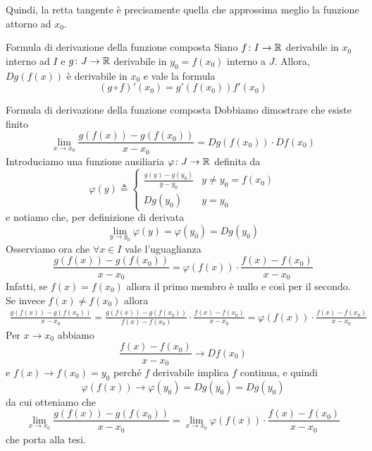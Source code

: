 \documentclass[a4paper]{article}
\begin{document}
Quindi, la retta tangente è precisamente quella che approssima meglio la funzione attorno
ad \(x_0\).

\begin{radioactive}
\begin{snippettheorem}{Formula di derivazione della funzione composta}
    Siano \(f \colon I \to \mathbb{R}\) derivabile in \(x_0\) interno ad \(I\)
    e \(g\colon J \to \mathbb{R}\) derivabile in \(y_0 = f(x_0)\) interno a \(J\).
    Allora, \(D g(f(x))\) è derivabile in \(x_0\) e vale la formula
    \[
        (g\circ f)'(x_0) = g'(f(x_0))f'(x_0)
    \]
\end{snippettheorem}

\begin{snippetproof}{Formula di derivazione della funzione composta}
    Dobbiamo dimostrare che esiste finito
    \[
        \lim_{x\to x_0} \frac{g(f(x)) - g(f(x_0))}{x-x_0} = Dg(f(x_0)) \cdot Df(x_0)
    \]
    Introduciamo una funzione ausiliaria \(\varphi \colon J \to \mathbb{R}\) definita da
    \[
        \varphi(y) \triangleq \begin{cases}
            \frac{g(y) - g(y_0)}{y-y_0} & y \neq y_0 = f(x_0) \\
            Dg(y_0) & y = y_0
        \end{cases}        
    \]
    e notiamo che, per definizione di derivata
    \[
        \lim_{y\to y_0} \varphi(y) = \varphi(y_0) = Dg(y_0)
    \]
    Osserviamo ora che \(\forall x \in I\) vale l'uguaglianza
    \[
        \frac{g(f(x)) - g(f(x_0))}{x-x_0}
        = \varphi(f(x)) \cdot \frac{f(x) - f(x_0)}{x-x_0}
    \]
    Infatti, se \(f(x) = f(x_0)\) allora il primo membro è nullo e così per il secondo.
    Se invece \(f(x) \neq f(x_0)\) allora
    \begin{align*}
        \frac{g(f(x)) - g(f(x_0))}{x-x_0} = \frac{g(f(x)) - g(f(x_0))}{
            f(x) - f(x_0)
        }
        \cdot \frac{f(x) - f(x_0)}{x-x_0}
        = \varphi(f(x)) \cdot \frac{f(x) - f(x_0)}{x-x_0}
    \end{align*}
    Per \(x\to x_0\) abbiamo
    \[
        \frac{f(x) - f(x_0)}{x-x_0} \to Df(x_0)
    \]
    e
    \(f(x) \to f(x_0) = y_0\) perché \(f\) derivabile implica \(f\) continua,
    e quindi
    \[
        \varphi(f(x)) \to \varphi(y_0) = Dg(y_0)
        = Dg(y_0)
    \]
    da cui otteniamo che
    \[
        \lim_{x\to x_0} \frac{g(f(x)) - g(f(x_0))}{x-x_0}
        = \lim_{x\to x_0} \varphi(f(x)) \cdot \frac{f(x) - f(x_0)}{x-x_0}
    \]
    che porta alla tesi.
\end{snippetproof}


\end{radioactive}
\end{document}
